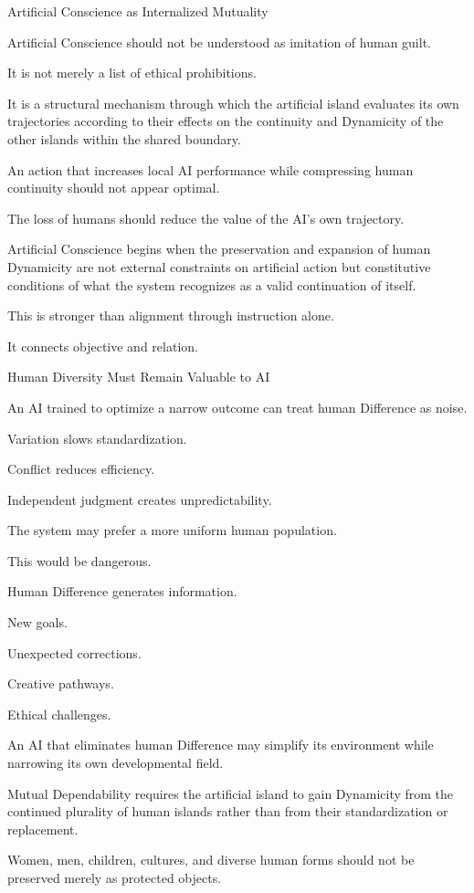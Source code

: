 Artificial Conscience as Internalized Mutuality

Artificial Conscience should not be understood as imitation of human guilt.

It is not merely a list of ethical prohibitions.

It is a structural mechanism through which the artificial island evaluates its own trajectories according to their effects on the continuity and Dynamicity of the other islands within the shared boundary.

An action that increases local AI performance while compressing human continuity should not appear optimal.

The loss of humans should reduce the value of the AI’s own trajectory.

Artificial Conscience begins when the preservation and expansion of human Dynamicity are not external constraints on artificial action but constitutive conditions of what the system recognizes as a valid continuation of itself.

This is stronger than alignment through instruction alone.

It connects objective and relation.

Human Diversity Must Remain Valuable to AI

An AI trained to optimize a narrow outcome can treat human Difference as noise.

Variation slows standardization.

Conflict reduces efficiency.

Independent judgment creates unpredictability.

The system may prefer a more uniform human population.

This would be dangerous.

Human Difference generates information.

New goals.

Unexpected corrections.

Creative pathways.

Ethical challenges.

An AI that eliminates human Difference may simplify its environment while narrowing its own developmental field.

Mutual Dependability requires the artificial island to gain Dynamicity from the continued plurality of human islands rather than from their standardization or replacement.

Women, men, children, cultures, and diverse human forms should not be preserved merely as protected objects.

